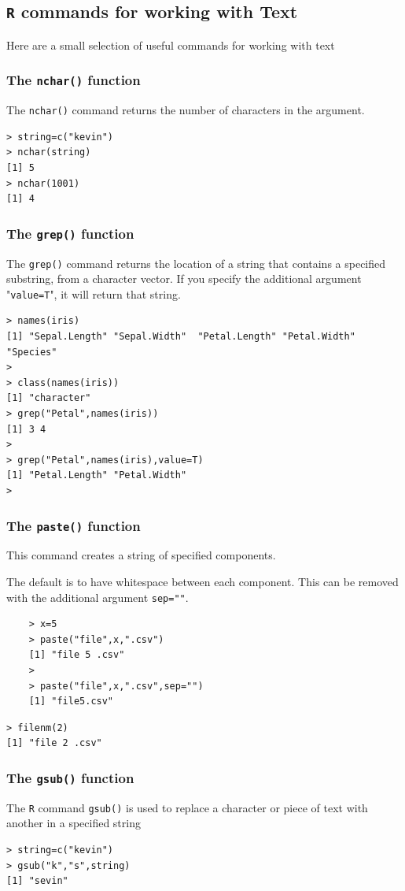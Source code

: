 \subsection*{\texttt{R} commands for working with Text}

Here are a small selection of useful commands for working with text

\subsubsection*{The \texttt{nchar()} function}
The \texttt{nchar()} command returns the number of characters in the argument.
\begin{verbatim}
> string=c("kevin")
> nchar(string)
[1] 5
> nchar(1001)
[1] 4
\end{verbatim}

\subsubsection*{The \texttt{grep()} function}
The \texttt{grep()} command returns the location of a string that contains a specified substring, from a character vector.
If you specify the additional argument "\texttt{value=T}", it will return that string.
\begin{verbatim}
> names(iris)
[1] "Sepal.Length" "Sepal.Width"  "Petal.Length" "Petal.Width"  "Species"     
> 
> class(names(iris))
[1] "character"
> grep("Petal",names(iris))
[1] 3 4
> 
> grep("Petal",names(iris),value=T)
[1] "Petal.Length" "Petal.Width" 
> 
\end{verbatim}
\newpage
\subsubsection*{The \texttt{paste()} function}
This command creates a string of specified components. 

\noindent The default is to have whitespace between each component. This can be removed with the additional argument \texttt{sep=""}.
\begin{framed}
	\begin{verbatim}
	> x=5
	> paste("file",x,".csv")
	[1] "file 5 .csv"
	>
	> paste("file",x,".csv",sep="")
	[1] "file5.csv"
	\end{verbatim}
\end{framed}
\begin{verbatim}
> filenm(2)
[1] "file 2 .csv"
\end{verbatim}
\subsubsection*{The \texttt{gsub()} function}
The \texttt{R} command \texttt{gsub()} is used to replace a character or piece of text with another in a specified string
\begin{verbatim}
> string=c("kevin")
> gsub("k","s",string)
[1] "sevin"
\end{verbatim}
\newpage

